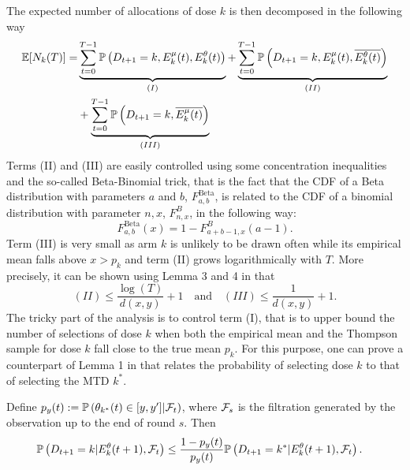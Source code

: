 The expected number of allocations of dose $k$ is then decomposed in the following way 
\begin{align*}
 \mathbb{E}[N_k(T)] = &\underbrace{\sum_{t=0}^{T-1}\mathbb{P}\left(D_{t+1} = k, E_k^\mu(t),E_k^\theta(t)\right)}_{(I)}+ \underbrace{\sum_{t=0}^{T-1}\mathbb{P}\left(D_{t+1} = k, E_k^\mu(t),\overline{E_k^\theta(t)}\right)}_{(II)}
 \\ &
 	+ \underbrace{\sum_{t=0}^{T-1}\mathbb{P}\left(D_{t+1} = k, \overline{E_k^\mu(t)}\right)}_{(III)}  
\end{align*}
Terms (II) and (III) are easily controlled using some concentration inequalities and the so-called Beta-Binomial trick, that is the fact that the CDF of a Beta distribution with parameters $a$ and $b$, $F^{\text{Beta}}_{a,b}$, is related to the CDF of a binomial distribution with parameter $n,x$, $F^{B}_{n,x}$, in the following way: \[F^{\text{Beta}}_{a,b}(x) = 1 - F^{B}_{a+b-1, x}(a - 1).\] Term (III) is very small as arm $k$ is unlikely to be drawn often while its empirical mean falls above $x > p_k$ and term (II) grows logarithmically with $T$. More precisely, it can be shown using Lemma 3 and 4 in \cite{AGAISTAT13} that 
\[
 (II)  \leq  \frac{\log(T)}{d(x,y)} + 1 \ \ \ \text{ and } \ \ \ (III)  \leq  \frac{1}{d(x,y)} + 1.
\] 
The tricky part of the analysis is to control term (I), that is to upper bound the number of selections of dose $k$ when both the empirical mean and the Thompson sample for dose $k$ fall close to the true mean $p_k$. For this purpose, one can prove a counterpart of Lemma 1 in \cite{AGAISTAT13} that relates the probability of selecting dose $k$ to that of selecting the MTD $k^*$. 

\begin{lemma}\label{lem:CrucialAG}Define $p_{y}(t) : = \mathbb{P}\left({\theta}_{k^*}(t) \in [y,y'] | \mathcal{F}_{t}\right)$, where $\mathcal{F}_{s}$ is the filtration generated by the observation up to the end of round $s$. Then 
\begin{align*}
&\mathbb{P}\left(D_{t+1} = k | E_{k}^\theta(t+1),\mathcal{F}_{t}\right)\leq \frac{1-p_{y}(t)}{p_y(t)}\mathbb{P}\left(D_{t+1} = k^* | E_k^\theta(t+1),\mathcal{F}_{t}\right).
\end{align*}
\end{lemma}

